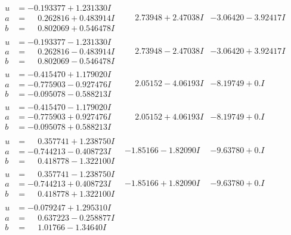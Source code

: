 \documentclass[1p]{elsarticle_modified}
\theoremstyle{definition}
\begin{document}
$$\begin{array}{c|c|c}
\begin{aligned}
u &= -0.193377 + 1.231330 I \\
a &= \phantom{-}0.262816 + 0.483914 I \\
b &= \phantom{-}0.802069 + 0.546478 I\end{aligned}
 & \phantom{-}2.73948 + 2.47038 I & -3.06420 - 3.92417 I \\ \hline\begin{aligned}
u &= -0.193377 - 1.231330 I \\
a &= \phantom{-}0.262816 - 0.483914 I \\
b &= \phantom{-}0.802069 - 0.546478 I\end{aligned}
 & \phantom{-}2.73948 - 2.47038 I & -3.06420 + 3.92417 I \\ \hline\begin{aligned}
u &= -0.415470 + 1.179020 I \\
a &= -0.775903 - 0.927476 I \\
b &= -0.095078 - 0.588213 I\end{aligned}
 & \phantom{-}2.05152 - 4.06193 I & -8.19749 + 0. I\phantom{ +0.000000I} \\ \hline\begin{aligned}
u &= -0.415470 - 1.179020 I \\
a &= -0.775903 + 0.927476 I \\
b &= -0.095078 + 0.588213 I\end{aligned}
 & \phantom{-}2.05152 + 4.06193 I & -8.19749 + 0. I\phantom{ +0.000000I} \\ \hline\begin{aligned}
u &= \phantom{-}0.357741 + 1.238750 I \\
a &= -0.744213 - 0.408723 I \\
b &= \phantom{-}0.418778 - 1.322100 I\end{aligned}
 & -1.85166 - 1.82090 I & -9.63780 + 0. I\phantom{ +0.000000I} \\ \hline\begin{aligned}
u &= \phantom{-}0.357741 - 1.238750 I \\
a &= -0.744213 + 0.408723 I \\
b &= \phantom{-}0.418778 + 1.322100 I\end{aligned}
 & -1.85166 + 1.82090 I & -9.63780 + 0. I\phantom{ +0.000000I} \\ \hline\begin{aligned}
u &= -0.079247 + 1.295310 I \\
a &= \phantom{-}0.637223 - 0.258877 I \\
b &= \phantom{-}1.01766 - 1.34640 I\end{aligned}

\end{array}$$
\end{document}
